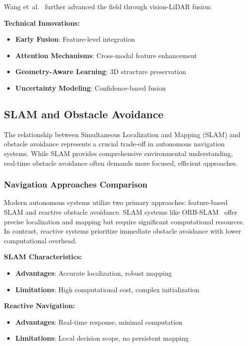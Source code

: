 \documentclass[12pt,oneside]{book}
\begin{document}
Wang et~al.~\cite{wang2021multi} further advanced the field through vision-LiDAR fusion:

\textbf{Technical Innovations:}
\begin{itemize}
    \item \textbf{Early Fusion}: Feature-level integration
    \item \textbf{Attention Mechanisms}: Cross-modal feature enhancement
    \item \textbf{Geometry-Aware Learning}: 3D structure preservation
    \item \textbf{Uncertainty Modeling}: Confidence-based fusion
\end{itemize}

\subsection{SLAM and Obstacle Avoidance}

The relationship between Simultaneous Localization and Mapping (SLAM) and obstacle avoidance represents a crucial trade-off in autonomous navigation systems. While SLAM provides comprehensive environmental understanding, real-time obstacle avoidance often demands more focused, efficient approaches.

\subsubsection{Navigation Approaches Comparison}
Modern autonomous systems utilize two primary approaches: feature-based SLAM and reactive obstacle avoidance. SLAM systems like ORB-SLAM~\cite{mur2015orb} offer precise localization and mapping but require significant computational resources. In contrast, reactive systems prioritize immediate obstacle avoidance with lower computational overhead.

\textbf{SLAM Characteristics:}
\begin{itemize}
    \item \textbf{Advantages}: Accurate localization, robust mapping
    \item \textbf{Limitations}: High computational cost, complex initialization
\end{itemize}

\textbf{Reactive Navigation:}
\begin{itemize}
    \item \textbf{Advantages}: Real-time response, minimal computation
    \item \textbf{Limitations}: Local decision scope, no persistent mapping
\end{itemize}
\end{document}
